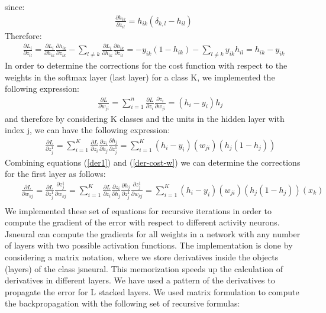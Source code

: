 \documentclass{article}
\begin{document}
since:
\begin{eqnarray}
\frac{\partial h_{ik}}{\partial z_{il}} = h_{ik}(\delta_{k,l} -h_{il})
\end{eqnarray}
Therefore:
\begin{eqnarray}
\frac{\partial L_i}{\partial z_{il}} = \frac{\partial L_i}{\partial h_{ik}}\frac{\partial h_{ik}}{\partial z_{ik}} - \sum_{l \neq k} \frac{\partial L_i}{\partial h_{ik}}\frac{\partial h_{ik}}{\partial z_{il}} = -y_{ik} (1-h_{ik}) - \sum_{l \neq k} y_{ik}h_{il} =  h_{ik}-y_{ik}
\label{deriv-cost}
\end{eqnarray}
In order to determine the corrections for the cost function with respect to the weights in the softmax layer (last layer) for a class K, we implemented the following expression:
\begin{eqnarray}
&&\frac{\partial{L}}{\partial{w_{ji}}} =  \sum_{i=1}^{n} \frac{\partial{L}}{\partial{z_i}}\frac{\partial{z_i}}{\partial{w_{ji}}}  = (h_i - y_i) h_j
\label{der0}
\end{eqnarray}
and therefore by considering K classes and the units in the hidden layer with index j, we can have the following expression:
\begin{eqnarray}
&&\frac{\partial{L}}{\partial{z^1_{j}}} =  \sum_{i=1}^{K} \frac{\partial{L}}{\partial{z_i}}\frac{\partial{z_i}}{\partial{h_{j}}} \frac{\partial{h_j}}{\partial{z^1_{j}}} = \sum_{i=1}^{K}  (h_{i}-y_{i})(w_{ji})(h_j (1-h_j))
\label{der1}
\end{eqnarray}
Combining equations (\ref{der1}) and (\ref{der-cost-w}) we can determine the corrections for the first layer as follows:
\begin{eqnarray}
&&\frac{\partial{L}}{\partial{w_{kj}}} = \frac{\partial{L}}{\partial{z^1_{j}}}\frac{\partial{z^1_j}}{\partial{w_{kj}}} =  \sum_{i=1}^{K} \frac{\partial{L}}{\partial{z_i}}\frac{\partial{z_i}}{\partial{h_{j}}} \frac{\partial{h_j}}{\partial{z^1_{j}}} \frac{\partial{z^1_j}}{\partial{w_{kj}}}= \sum_{i=1}^{K}  (h_{i}-y_{i})(w_{ji})(h_j (1-h_j))(x_k) \nonumber \\
\label{der2}
\end{eqnarray}
We implemented these set of equations for recursive iterations in order to compute the gradient of the error with respect to different activity neurons. Jsneural can compute the gradients for all weights in a network with any number of layers with two possible activation functions. The implementation is done by considering a matrix notation, where we store derivatives inside the objects (layers) of the class jsneural.  This memorization  speeds up the calculation of derivatives in different layers. We have used a pattern of the derivatives to propagate the error for L stacked layers. We used matrix formulation to compute the backpropagation with the following set of recursive formulas:
\end{document}
